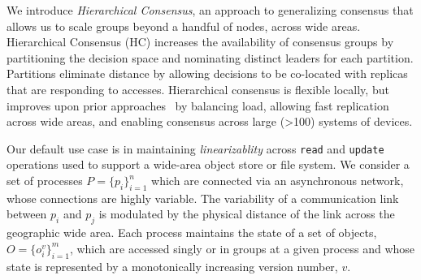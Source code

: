 \documentclass[11pt,letterpaper]{article}
\begin{document}
%


We introduce \emph{Hierarchical Consensus}, an approach to generalizing
consensus that allows us to scale groups beyond a handful of nodes, across
wide areas.
Hierarchical Consensus (HC) increases the availability of consensus groups by
partitioning the decision space and nominating distinct leaders for each
partition.
Partitions eliminate distance by allowing decisions to be co-located with
replicas that are responding to accesses.
Hierarchical consensus is flexible locally, but improves upon prior
approaches~\cite{lamport_paxos_2001,2016arXiv160806696H,biely_s-paxos:_2012,mao_mencius:_2008,moraru_there_2013,kraska_mdcc:_2013}
by balancing load, allowing fast replication across wide areas, and enabling
consensus across large (\textgreater 100) systems of devices.

Our default use case is in maintaining \emph{linearizablity} across
\texttt{read} and \texttt{update} operations used to support a wide-area
object store or file system.
%
%
We consider a set of processes $P = \{p_i\}_{i=1}^n$ which are connected via
an asynchronous network, whose connections are highly variable.
The variability of a communication link between $p_i$ and $p_j$ is modulated
by the physical distance of the link across the geographic wide area.
Each process maintains the state of a set of objects, $O = \{o_i^v\}_{i=1}^m$,
which are accessed singly or in groups at a given process and whose state is
represented by a monotonically increasing version number, $v$.
\end{document}
